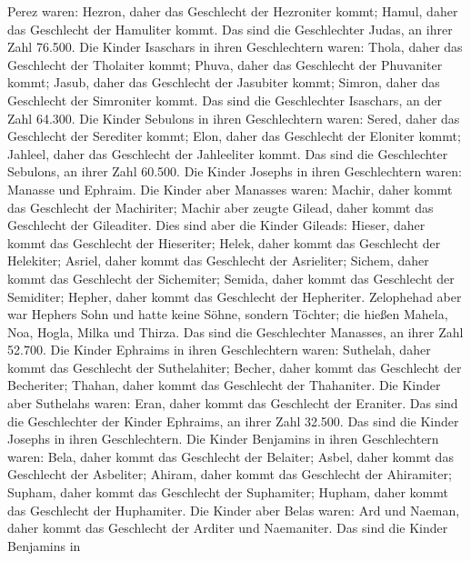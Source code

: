 Perez waren: Hezron, daher das Geschlecht der Hezroniter kommt; Hamul,
daher das Geschlecht der Hamuliter kommt.  Das sind die
Geschlechter Judas, an ihrer Zahl 76.500.  Die Kinder
Isaschars in ihren Geschlechtern waren: Thola, daher das Geschlecht der
Tholaiter kommt; Phuva, daher das Geschlecht der Phuvaniter kommt;
 Jasub, daher das Geschlecht der Jasubiter kommt; Simron,
daher das Geschlecht der Simroniter kommt.  Das sind die
Geschlechter Isaschars, an der Zahl 64.300.  Die Kinder
Sebulons in ihren Geschlechtern waren: Sered, daher das Geschlecht der
Serediter kommt; Elon, daher das Geschlecht der Eloniter kommt; Jahleel,
daher das Geschlecht der Jahleeliter kommt.  Das sind die
Geschlechter Sebulons, an ihrer Zahl 60.500.  Die Kinder
Josephs in ihren Geschlechtern waren: Manasse und Ephraim.
 Die Kinder aber Manasses waren: Machir, daher kommt das
Geschlecht der Machiriter; Machir aber zeugte Gilead, daher kommt das
Geschlecht der Gileaditer.  Dies sind aber die Kinder
Gileads: Hieser, daher kommt das Geschlecht der Hieseriter; Helek, daher
kommt das Geschlecht der Helekiter;  Asriel, daher kommt
das Geschlecht der Asrieliter; Sichem, daher kommt das Geschlecht der
Sichemiter;  Semida, daher kommt das Geschlecht der
Semiditer; Hepher, daher kommt das Geschlecht der Hepheriter.
 Zelophehad aber war Hephers Sohn und hatte keine Söhne,
sondern Töchter; die hießen Mahela, Noa, Hogla, Milka und Thirza.
 Das sind die Geschlechter Manasses, an ihrer Zahl
52.700.  Die Kinder Ephraims in ihren Geschlechtern
waren: Suthelah, daher kommt das Geschlecht der Suthelahiter; Becher,
daher kommt das Geschlecht der Becheriter; Thahan, daher kommt das
Geschlecht der Thahaniter.  Die Kinder aber Suthelahs
waren: Eran, daher kommt das Geschlecht der Eraniter. 
Das sind die Geschlechter der Kinder Ephraims, an ihrer Zahl 32.500. Das
sind die Kinder Josephs in ihren Geschlechtern.  Die
Kinder Benjamins in ihren Geschlechtern waren: Bela, daher kommt das
Geschlecht der Belaiter; Asbel, daher kommt das Geschlecht der
Asbeliter; Ahiram, daher kommt das Geschlecht der Ahiramiter;
 Supham, daher kommt das Geschlecht der Suphamiter;
Hupham, daher kommt das Geschlecht der Huphamiter.  Die
Kinder aber Belas waren: Ard und Naeman, daher kommt das Geschlecht der
Arditer und Naemaniter.  Das sind die Kinder Benjamins in
